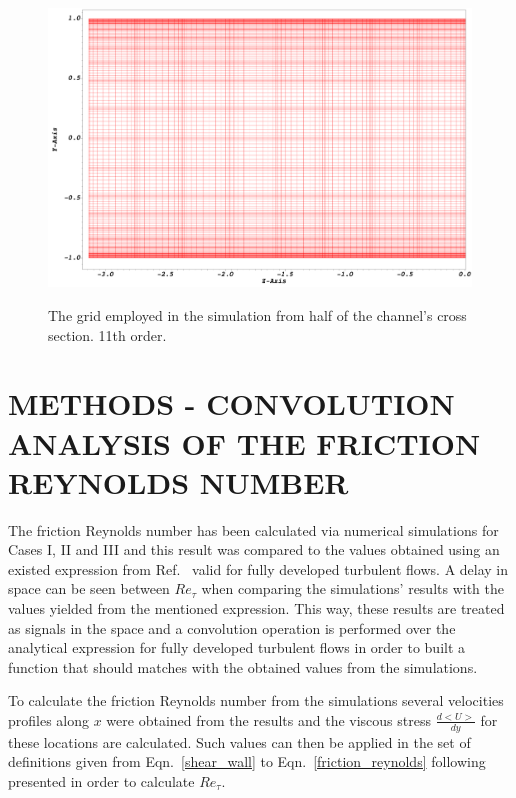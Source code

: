\documentclass[twocolumn,10pt]{asme2e}
\begin{document}
\begin{figure}[t]
	\centering
	\scalebox{0.16}
	{\includegraphics{mesh.png}}
	\caption{The grid employed in the simulation from half of the channel's cross section. 11th order.}
	\label{fig:mesh}
\end{figure}

\section*{METHODS - CONVOLUTION ANALYSIS OF THE FRICTION REYNOLDS NUMBER}

The friction Reynolds number has been calculated via numerical simulations for Cases I, II and III and this result was compared to the values obtained using an existed expression from Ref.~\cite{pope} valid for fully developed turbulent flows. A delay in space can be seen between \(Re_{\tau}\) when comparing the simulations' results with the values yielded from the mentioned expression. This way, these results are treated as signals in the space and a convolution operation is performed over the analytical expression for fully developed turbulent flows in order to built a function that should matches with the obtained values from the simulations.

To calculate the friction Reynolds number from the simulations several velocities profiles along \(x\) were obtained from the results and the viscous stress \(\frac{d<U>}{dy}\) for these locations are calculated. Such values can then be applied in the set of definitions given from Eqn.~\ref{shear_wall} to Eqn.~\ref{friction_reynolds} following presented in order to calculate \(Re_{\tau}\).
\end{document}
